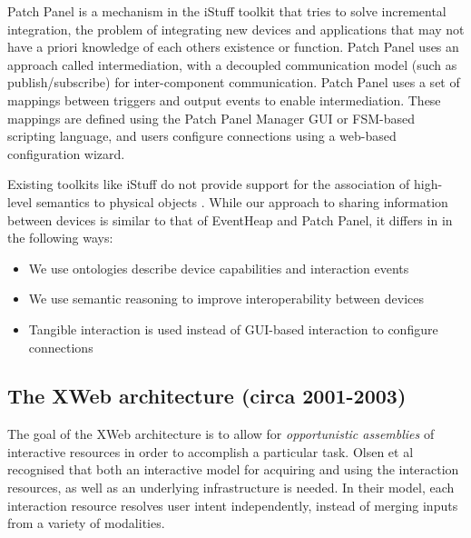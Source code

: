 
Patch Panel \cite{Ballagas2004} is a mechanism in the iStuff toolkit that tries to solve incremental integration, the problem of integrating new devices and applications that may not have a priori knowledge of each others existence or function. Patch Panel uses an approach called intermediation, with a decoupled communication model (such as publish/subscribe) for inter-component communication.  Patch Panel uses a set of mappings between triggers and output events to enable intermediation. These mappings are defined using the Patch Panel Manager \ac{GUI} or \ac{FSM}-based scripting language, and users configure connections using a web-based configuration wizard.



Existing toolkits like iStuff do not provide support for the association of high-level semantics to physical objects \cite{Shaer2004}. While our approach to sharing information between devices is similar to that of EventHeap and Patch Panel, it differs in in the following ways:

\begin{itemize}
    \item We use ontologies describe device capabilities and interaction events
    \item We use semantic reasoning to improve interoperability between devices
    \item Tangible interaction is used instead of \ac{GUI}-based interaction to configure connections
\end{itemize}


\subsection{The XWeb architecture (circa 2001-2003)}
The goal of the XWeb architecture is to allow for \emph{opportunistic assemblies} of interactive resources in order to accomplish a particular task. Olsen et al \cite{Olsen2001} recognised that both an interactive model for acquiring and using the interaction resources, as well as an underlying infrastructure is needed. In their model, each interaction resource resolves user intent independently, instead of merging inputs from a variety of modalities.

